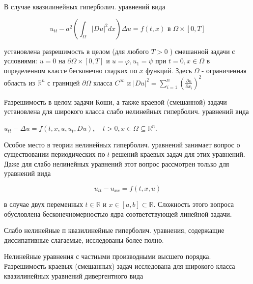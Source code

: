 \documentclass[10pt]{article}
\begin{document}
В случае квазилинейных гиперболич. уравнений вида



\[

u_{t t}-a^{2}\left(\int_{\Omega}|D u|^{2} d x\right) \Delta u=f(t, x) \text { в } \Omega \times[0, T]

\]



установлена разрешимость в целом (для любого $T>0$ ) смешанной задачи с условиями: $u=0$ на $\partial \Omega \times[0, T]$ и $u=\varphi, u_{1}=\psi$ при $t=0, x \in \Omega$ в определенном классе бесконечно гладких по $x$ функций. Здесь $\Omega$ - ограниченная область из $\mathbb{R}^{n}$ с границей $\partial \Omega$ класса $C^{\infty}$ и $|D u|^{2}=\sum_{i=1}^{n}\left(\frac{\partial u}{\partial x_{i}}\right)^{2}$



Разрешимость в целом задачи Коши, а также краевой (смешанной) задачи установлена для широкого класса слабо нелинейных гиперболич. уравнений вида



$u_{t t}-\Delta u=f\left(t, x, u, u_{t}, D u\right), \quad t>0, x \in \Omega \subseteq \mathbb{R}^{n}$.



Особое место в теории нелинейных гиперболич. уравнений занимает вопрос о существовании периодических по $t$ решений краевых задач для этих уравнений. Даже для слабо нелинейных уравнений этот вопрос рассмотрен только для уравнений вида



\[

u_{t t}-u_{x x}=f(t, x, u)

\]



в случае двух переменных $t \in \mathbb{R}$ и $x \in[a, b] \subset \mathbb{R}$. Сложность этого вопроса обусловлена бесконечномерностью ядра соответствующей линейной задачи.



Слабо нелинейные п квазилинейные гиперболич. уравнения, содержащие диссипативные слагаемые, исследованы более полно.



Нелинейные уравнения с частными производными высшего порядка. Разрешимость краевых (смешанных) задач исследована для широкого класса квазилинейных уравнений дивергентного вида
\end{document}
